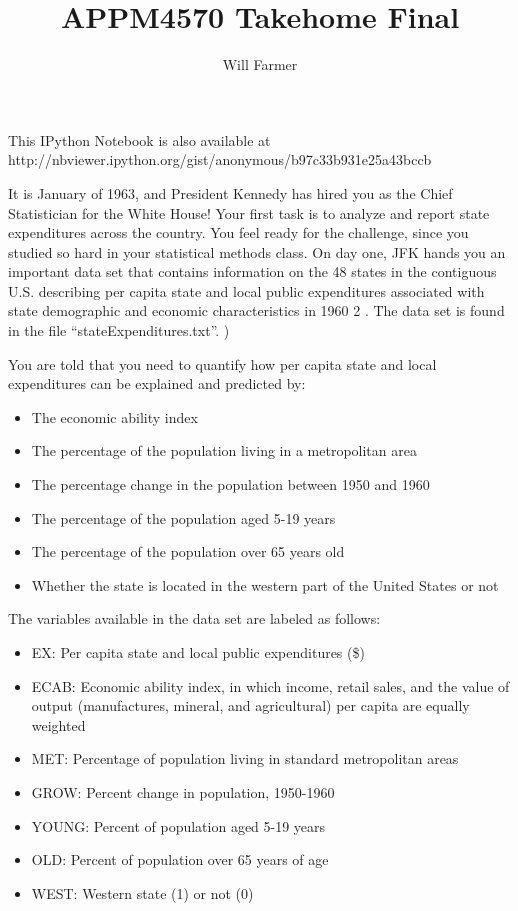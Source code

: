 \documentclass{article}
\title{APPM4570 Takehome Final}
\author{Will Farmer}
\begin{document}
    
    
    \maketitle
    
    

    
    This IPython Notebook is also available at
http://nbviewer.ipython.org/gist/anonymous/b97c33b931e25a43bccb

    It is January of 1963, and President Kennedy has hired you as the Chief
Statistician for the White House! Your first task is to analyze and
report state expenditures across the country. You feel ready for the
challenge, since you studied so hard in your statistical methods class.
On day one, JFK hands you an important data set that contains
information on the 48 states in the contiguous U.S. describing per
capita state and local public expenditures associated with state
demographic and economic characteristics in 1960 2 . The data set is
found in the file ``stateExpenditures.txt''. )

You are told that you need to quantify how per capita state and local
expenditures can be explained and predicted by:

\begin{itemize}
\itemsep1pt\parskip0pt
\item
  The economic ability index
\item
  The percentage of the population living in a metropolitan area
\item
  The percentage change in the population between 1950 and 1960
\item
  The percentage of the population aged 5-19 years
\item
  The percentage of the population over 65 years old
\item
  Whether the state is located in the western part of the United States
  or not
\end{itemize}

The variables available in the data set are labeled as follows:

\begin{itemize}
\itemsep1pt\parskip0pt
\item
  EX: Per capita state and local public expenditures (\$)
\item
  ECAB: Economic ability index, in which income, retail sales, and the
  value of output (manufactures, mineral, and agricultural) per capita
  are equally weighted
\item
  MET: Percentage of population living in standard metropolitan areas
\item
  GROW: Percent change in population, 1950-1960
\item
  YOUNG: Percent of population aged 5-19 years
\item
  OLD: Percent of population over 65 years of age
\item
  WEST: Western state (1) or not (0)
\end{itemize}
\end{document}
